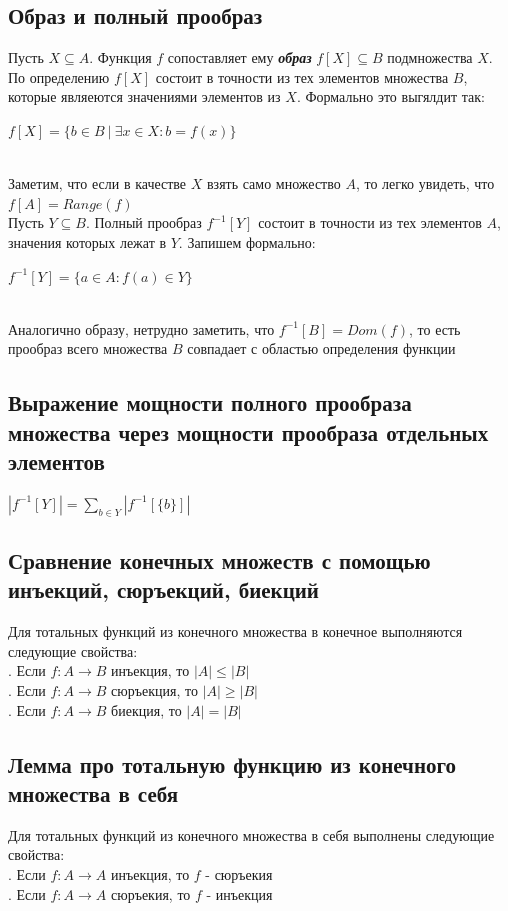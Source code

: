 \documentclass[a4paper]{article}
\begin{document}
\subsection{Образ и полный прообраз}
Пусть $X\subseteq A$. Функция $f$ сопоставляет ему \textbf{\textit{образ}} $f[X]\subseteq B$ подмножества $X$. По определению $f[X]$ состоит в точности из тех элементов множества $B$, которые являеются значениями элементов из $X$. Формально это выгялдит так:\\[2mm]
\centerline{$f[X]=\{b\in B\ |\ \exists x\in X: b=f(x)\}$}\\[2mm]
\indent Заметим, что если в качестве $X$ взять само множество $A$, то легко увидеть, что $f[A]={Range}(f)$\\[2mm]
\indent Пусть $Y\subseteq B$. Полный прообраз $f^{-1}[Y]$ состоит в точности из тех элементов $A$, значения которых лежат в $Y$. Запишем формально:\\[2mm]
\centerline{$f^{-1}[Y]=\{a\in A: f(a)\in Y\}$}\\[2mm]
\indent Аналогично образу, нетрудно заметить, что $f^{-1}[B]=Dom(f)$, то есть прообраз всего множества $B$ совпадает с областью определения функции
\subsection{Выражение мощности полного прообраза множества через мощности прообраза отдельных элементов}
\label{sec:1.28}$|f^{-1}[Y]|=\sum\limits_{b\in Y} |f^{-1}[\{b\}]|$
\subsection{Сравнение конечных множеств с помощью инъекций, сюръекций, биекций}
Для тотальных функций из конечного множества в конечное выполняются следующие свойства:\\[2mm]
. Если $f: A\rightarrow B$ инъекция, то $|A|\leqslant|B|$\\[2mm]
. Если $f: A\rightarrow B$ сюръекция, то $|A|\geqslant|B|$\\[2mm]
. Если $f: A\rightarrow B$ биекция, то $|A|=|B|$\\[2mm]
\subsection{Лемма про тотальную функцию из конечного множества в себя}
Для тотальных функций из конечного множества в себя выполнены следующие свойства:\\[2mm]
. Если $f: A\rightarrow A$ инъекция, то $f$ - сюръекия\\[2mm]
. Если $f: A\rightarrow A$ сюръекия, то $f$ - инъекция
\end{document}
